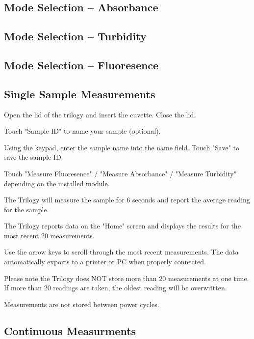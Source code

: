 \documentclass[12pt]{../SOP4_alpha}\usepackage[]{graphicx}\usepackage[]{color}
\begin{document}
\subsection{Mode Selection -- Absorbance}



\subsection{Mode Selection -- Turbidity}



\subsection{Mode Selection -- Fluoresence}



\subsection{Single Sample Measurements}

\NP Open the lid of the trilogy and insert the cuvette. Close the lid.

\NP Touch "Sample ID" to name your sample (optional).

\NP Using the keypad, enter the sample name into the name field. Touch "Save" to save the sample ID.

\NP Touch "Measure Fluoresence" / "Measure Absorbance" / "Measure Turbidity" depending on the installed module.

\NP The Trilogy will measure the sample for 6 seconds and report the average reading for the sample. 

\NP The Trilogy reports data on the "Home" screen and displays the results for the most recent 20 measurements. 

\NP Use the arrow keys to scroll through the most recent measurements. The data automatically exports to a printer or PC when properly connected. 

\NP Please note the Trilogy does NOT store more than 20 measurements at one time. If more than 20 readings are taken, the oldest reading will be overwritten. 

\NP Measurements are not stored between power cycles. 

\subsection{Continuous Measurments}
\end{document}
